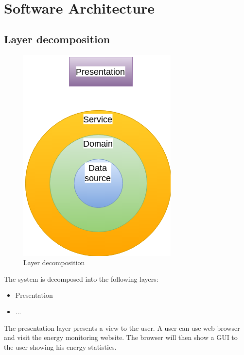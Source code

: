 \chapter{Software Architecture}
\label{ch:software}

\section{Layer decomposition}

\begin{figure}[H]
\centering
\includegraphics[scale=0.7]{7-software/images/LayersCircle.png}
\caption{Layer decomposition}
\label{fig:layerscircle}
\end{figure}

The system is decomposed into the following layers:
\begin{itemize}
\item Presentation
\item ...
\end{itemize}

The presentation layer presents a view to the user. A user can use web browser and visit the energy monitoring website. The browser will then show a GUI to the user showing his energy statistics.\\




